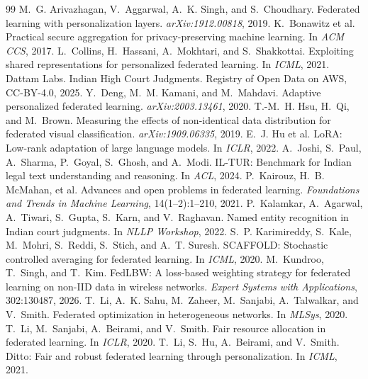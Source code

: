 \documentclass[11pt,a4paper]{article}
\begin{document}
\begin{thebibliography}{99}\small
{} M.~G. Arivazhagan, V.~Aggarwal, A.~K. Singh, and S.~Choudhary. Federated learning with personalization layers. \emph{arXiv:1912.00818}, 2019.
 K.~Bonawitz et al. Practical secure aggregation for privacy-preserving machine learning. In \emph{ACM CCS}, 2017.
 L.~Collins, H.~Hassani, A.~Mokhtari, and S.~Shakkottai. Exploiting shared representations for personalized federated learning. In \emph{ICML}, 2021.
 Dattam Labs. Indian High Court Judgments. Registry of Open Data on AWS, CC-BY-4.0, 2025.
 Y.~Deng, M.~M. Kamani, and M.~Mahdavi. Adaptive personalized federated learning. \emph{arXiv:2003.13461}, 2020.
 T.-M.~H. Hsu, H.~Qi, and M.~Brown. Measuring the effects of non-identical data distribution for federated visual classification. \emph{arXiv:1909.06335}, 2019.
 E.~J. Hu et al. LoRA: Low-rank adaptation of large language models. In \emph{ICLR}, 2022.
 A.~Joshi, S.~Paul, A.~Sharma, P.~Goyal, S.~Ghosh, and A.~Modi. IL-TUR: Benchmark for Indian legal text understanding and reasoning. In \emph{ACL}, 2024.
 P.~Kairouz, H.~B. McMahan, et al. Advances and open problems in federated learning. \emph{Foundations and Trends in Machine Learning}, 14(1--2):1--210, 2021.
 P.~Kalamkar, A.~Agarwal, A.~Tiwari, S.~Gupta, S.~Karn, and V.~Raghavan. Named entity recognition in Indian court judgments. In \emph{NLLP Workshop}, 2022.
 S.~P. Karimireddy, S.~Kale, M.~Mohri, S.~Reddi, S.~Stich, and A.~T. Suresh. SCAFFOLD: Stochastic controlled averaging for federated learning. In \emph{ICML}, 2020.
 M.~Kundroo, T.~Singh, and T.~Kim. FedLBW: A loss-based weighting strategy for federated learning on non-IID data in wireless networks. \emph{Expert Systems with Applications}, 302:130487, 2026.
 T.~Li, A.~K. Sahu, M.~Zaheer, M.~Sanjabi, A.~Talwalkar, and V.~Smith. Federated optimization in heterogeneous networks. In \emph{MLSys}, 2020.
 T.~Li, M.~Sanjabi, A.~Beirami, and V.~Smith. Fair resource allocation in federated learning. In \emph{ICLR}, 2020.
 T.~Li, S.~Hu, A.~Beirami, and V.~Smith. Ditto: Fair and robust federated learning through personalization. In \emph{ICML}, 2021.

\end{thebibliography}
\end{document}
